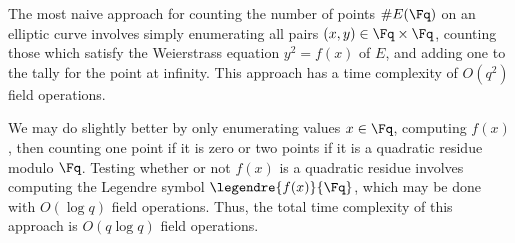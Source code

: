 
The most naive approach for counting the number of points $\#E(\Fq)$ on an elliptic curve involves simply enumerating all pairs $(x, y) \in \Fq \times \Fq$, counting those which satisfy the Weierstrass equation $y^2 = f(x)$ of $E$, and adding one to the tally for the point at infinity. This approach has a time complexity of $O(q^2)$ field operations.

We may do slightly better by only enumerating values $x \in \Fq$, computing $f(x)$, then counting one point if it is zero or two points if it is a quadratic residue modulo $\Fq$. Testing whether or not $f(x)$ is a quadratic residue involves computing the Legendre symbol $\legendre{f(x)}{\Fq}$, which may be done with $O(\log q)$ field operations. Thus, the total time complexity of this approach is $O(q \log q)$ field operations.


